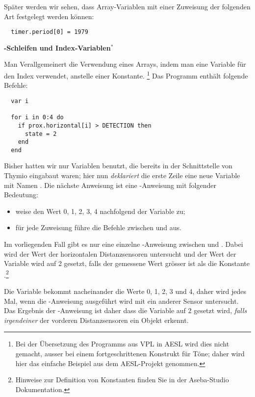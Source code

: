Später werden wir sehen, dass Array-Variablen mit einer Zuweisung der folgenden Art festgelegt werden können: 
\begin{footnotesize}
\begin{verbatim}
  timer.period[0] = 1979
\end{verbatim}
\end{footnotesize}

\textbf{\large {}-Schleifen und Index-Variablen$^*$}

Man Verallgemeinert die Verwendung eines Arrays, indem man eine Variable für den Index verwendet, anstelle einer Konstante. \footnote{Bei der Übersetzung des Programms aus VPL in AESL wird dies nicht gemacht, ausser bei einem fortgeschrittenen Konstrukt für Töne; daher wird hier das einfache Beispiel aus dem AESL-Projekt genommen.} Das Programm  enthält folgende Befehle: 

\begin{footnotesize}
\begin{verbatim}
  var i

  for i in 0:4 do
    if prox.horizontal[i] > DETECTION then
      state = 2
    end
  end
\end{verbatim}
\end{footnotesize}

Bisher hatten wir nur Variablen benutzt, die bereits in der Schnittstelle von Thymio eingabaut waren; hier nun \emph{deklariert} die erste Zeile eine neue Variable mit Namen . Die nächste Anweisung ist eine -Anweisung mit folgender Bedeutung: 

\begin{itemize}
\item weise den Wert 0, 1, 2, 3, 4 nachfolgend der Variable  zu;
\item für jede Zuweisung führe die Befehle zwischen  und  aus.
\end{itemize}

Im vorliegenden Fall gibt es nur eine einzelne -Anweisung zwischen  und . Dabei wird der Wert der horizontalen Distanzsensoren untersucht und der Wert der Variable  wird auf 2 gesetzt, falls der gemessene Wert grösser ist als die Konstante .\footnote{Hinweise zur Definition von Konstanten finden Sie in der Aseba-Studio Dokumentation.}

Die Variable  bekommt nacheinander die Werte 0, 1, 2, 3 und 4, daher wird jedes Mal, wenn die -Anweisung ausgeführt wird mit  ein anderer Sensor untersucht. Das Ergebnis der -Anweisung ist daher dass die Variable  auf 2 gesetzt wird, \emph{falls} \emph{irgendeiner} der vorderen Distanzsensoren ein Objekt erkennt.

